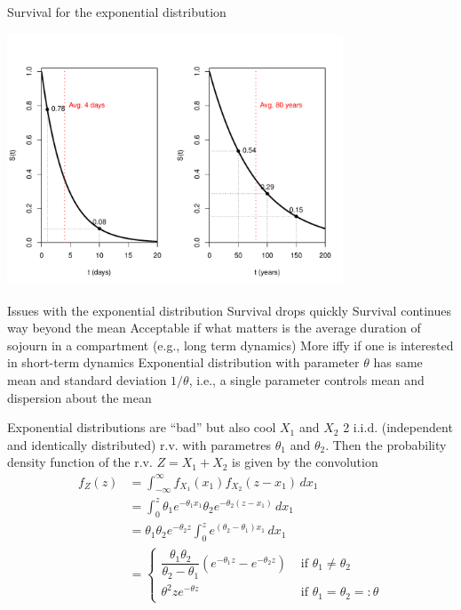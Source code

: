 \documentclass[aspectratio=169]{beamer}\usepackage[]{graphicx}\usepackage[]{xcolor}
\begin{document}
\begin{frame}{Survival for the exponential distribution}
\begin{center}
\includegraphics[width=0.75\textwidth]{FIGS/L24-prop_surviving_exp_80years_details-1.pdf}
\end{center}
\end{frame}

\begin{frame}{Issues with the exponential distribution}
\bbullet Survival drops quickly
\vfill
\bbullet Survival continues way beyond the mean
\vfill
Acceptable if what matters is the average duration of sojourn in a compartment (e.g., long term dynamics)
\vfill
More iffy if one is interested in short-term dynamics
\vfill
\bbullet Exponential distribution with parameter $\theta$ has same mean and standard deviation $1/\theta$, i.e., a single parameter controls mean and dispersion about the mean
\end{frame}

\begin{frame}{Exponential distributions are ``bad'' but also cool}
$X_1$ and $X_2$ 2 i.i.d. (independent and identically distributed) r.v. with parametres $\theta_1$ and $\theta_2$. Then the probability density function of the r.v. $Z=X_1+X_2$ is given by the convolution
\begin{align}
 f_Z(z) &= \int_{-\infty}^\infty f_{X_1}(x_1) f_{X_2}(z - x_1)\,dx_1 \nonumber\\
   &= \int_0^z \theta_1 e^{-\theta_1 x_1} \theta_2 e^{-\theta_2(z - x_1)} \, dx_1 \nonumber\\
   &= \theta_1 \theta_2 e^{-\theta_2 z} \int_0^z e^{(\theta_2 - \theta_1)x_1}\,dx_1 \nonumber\\
   &= \begin{cases}
        \dfrac{\theta_1 \theta_2}{\theta_2-\theta_1} \left(e^{-\theta_1 z} - e^{-\theta_2 z}\right) & \text{ if } \theta_1 \neq \theta_2 \\
        \theta^2 z e^{-\theta z} & \text{ if } \theta_1 = \theta_2 =: \theta
      \end{cases}
\end{align}
\end{frame}
\end{document}
